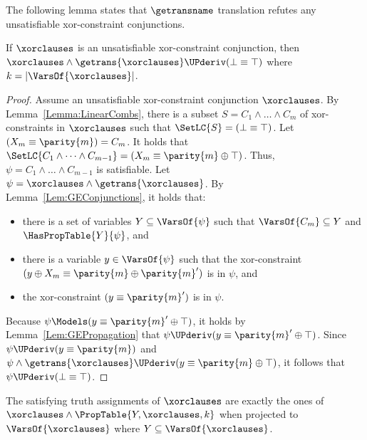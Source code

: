 The following lemma states that $\getransname$ translation refutes any
unsatisfiable xor-constraint conjunctions.
\begin{lemma}
\label{Lem:GEUnsat}
If $\xorclauses$ is an unsatisfiable xor-constraint conjunction, then
$\xorclauses \wedge \getrans{\xorclauses} \UPderiv (\bot \equiv \top) $ where
$k=|\VarsOf{\xorclauses}|$.
\end{lemma}

\begin{proof}
Assume an unsatisfiable xor-constraint conjunction $ \xorclauses$.
By Lemma~\ref{Lemma:LinearCombs}, there is a subset $S = C_1 \wedge \dots \wedge C_m $ of xor-constraints in $\xorclauses$ 
such that $\SetLC{S} = (\bot \equiv \top) $.
Let $ (X_m \equiv \parity{m}) = C_m$.  It holds that $ \SetLC{C_1 \wedge \dots
\wedge C_{m-1}} = (X_m \equiv \parity{m} \oplus \top) $. Thus, $ \psi = C_1
\wedge \dots \wedge C_{m-1} $ is satisfiable. 
Let $\psi = \xorclauses \wedge \getrans{\xorclauses}$.
By
Lemma~\ref{Lem:GEConjunctions}, it holds that:
\begin{itemize}

\item there is a set of variables $ Y \subseteq
\VarsOf{\psi} $ such that $ \VarsOf{C_m}
\subseteq Y $ and $ \HasPropTable{Y}{\psi} $, and

\item there is a variable $ y \in \VarsOf{\psi}$
such that the xor-constraint $ (y \oplus X_m \equiv
    \parity{m} \oplus \parity{m}') $ is in $\psi$, and

\item the xor-constraint $ (y \equiv \parity{m}') $ is in $ \psi$.
\end{itemize}

Because $ \psi \Models (y \equiv \parity{m}' \oplus \top) $, it holds 
by Lemma~\ref{Lem:GEPropagation} that $\psi \UPderiv (y \equiv \parity{m}' \oplus \top) $.
Since $ \psi \UPderiv (y \equiv \parity{m}) $ and $ \psi \wedge
\getrans{\xorclauses} \UPderiv (y \equiv \parity{m} \oplus \top) $, it follows
that $ \psi \UPderiv (\bot \equiv \top) $.
\end{proof}

\begin{lemma} 
\label{Lem:PropTableModels}
The satisfying truth assignments of $\xorclauses$ are exactly the
ones of $ \xorclauses \wedge \PropTable{Y, \xorclauses, k}$ when projected to $
\VarsOf{\xorclauses}$ where $ Y \subseteq \VarsOf{\xorclauses}$.
\end{lemma}

